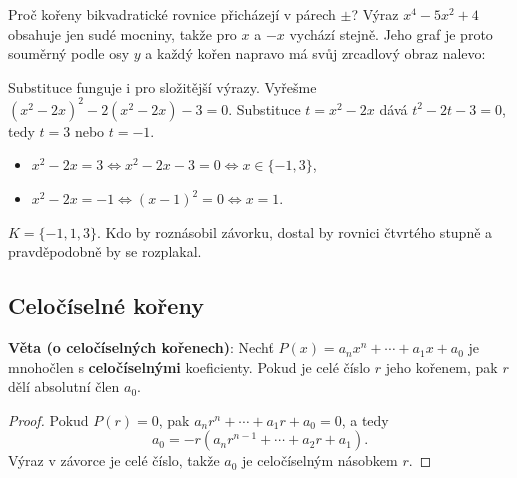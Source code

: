 Proč kořeny bikvadratické rovnice přicházejí v párech $\pm$? Výraz $x^4 - 5x^2 + 4$ obsahuje jen sudé mocniny, takže pro $x$ a $-x$ vychází stejně. Jeho graf je proto souměrný podle osy $y$ a každý kořen napravo má svůj zrcadlový obraz nalevo:
\begin{center}
\end{center}

\begin{example}
  Substituce funguje i pro složitější výrazy. Vyřešme ${(x^2 - 2x)}^2 - 2(x^2 - 2x) - 3 = 0$. Substituce $t = x^2 - 2x$ dává $t^2 - 2t - 3 = 0$, tedy $t = 3$ nebo $t = -1$.
  \begin{itemize}
    \item $x^2 - 2x = 3\Leftrightarrow x^2 - 2x - 3 = 0\Leftrightarrow x\in\{-1, 3\}$,
    \item $x^2 - 2x = -1\Leftrightarrow{(x - 1)}^2 = 0\Leftrightarrow x = 1$.
  \end{itemize}
  $K = \{-1, 1, 3\}$. Kdo by roznásobil závorku, dostal by rovnici čtvrtého stupně a pravděpodobně by se rozplakal.
\end{example}

\subsection{Celočíselné kořeny}\label{sec:celociselne-koreny}

\begin{definitionbox}
  \textbf{Věta (o celočíselných kořenech)}: Nechť $P(x) = a_nx^n + \cdots + a_1x + a_0$ je mnohočlen s \textbf{celočíselnými} koeficienty. Pokud je celé číslo $r$ jeho kořenem, pak $r$ dělí absolutní člen $a_0$.
\end{definitionbox}

\begin{proof}
  Pokud $P(r) = 0$, pak $a_nr^n + \cdots + a_1r + a_0 = 0$, a tedy
  \begin{equation*}
    a_0 = -r\left(a_nr^{n-1} + \cdots + a_2r + a_1\right).
  \end{equation*}
  Výraz v závorce je celé číslo, takže $a_0$ je celočíselným násobkem $r$.
\end{proof}

